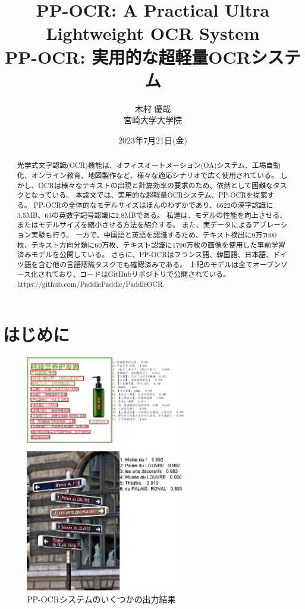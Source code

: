 \documentclass[uplatex, twocolumn,10pt]{jsarticle}
\begin{document}
\title{\bf{\LARGE{PP-OCR: A Practical Ultra Lightweight OCR System} \\ \Large{PP-OCR: 実用的な超軽量OCRシステム}}}
\author{木村 優哉\\宮崎大学大学院}
\date{2023年7月21日(金)}
\maketitle

\begin{abstract}
    光学式文字認識(OCR)機能は、オフィスオートメーション(OA)システム、工場自動化、オンライン教育、地図製作など、様々な適応シナリオで広く使用されている。
    しかし、OCRは様々なテキストの出現と計算効率の要求のため、依然として困難なタスクとなっている。
    本論文では、実用的な超軽量OCRシステム、PP-OCRを提案する。
    PP-OCRの全体的なモデルサイズはほんのわずかであり、6622の漢字認識に3.5MB、63の英数字記号認識に2.8MBである。
    私達は、モデルの性能を向上させる、またはモデルサイズを縮小させる方法を紹介する。
    また、実データによるアブレーション実験も行う。
    一方で、中国語と英語を認識するため、テキスト検出に9万7000枚、テキスト方向分類に60万枚、テキスト認識に1790万枚の画像を使用した事前学習済みモデルを公開している。
    さらに、PP-OCRはフランス語、韓国語、日本語、ドイツ語を含む他の言語認識タスクでも確認済みである。
    上記のモデルは全てオープンソース化されており、コードはGitHubリポジトリで公開されている。https://github.com/PaddlePaddle/PaddleOCR.
\end{abstract}

\section{はじめに}
\begin{figure}[t]
    \begin{center}
        \includegraphics*[width=7cm]{image/Figure1.png}
        \caption{PP-OCRシステムのいくつかの出力結果}
        \label{Figure1}
    \end{center}
\end{figure}
\end{document}
